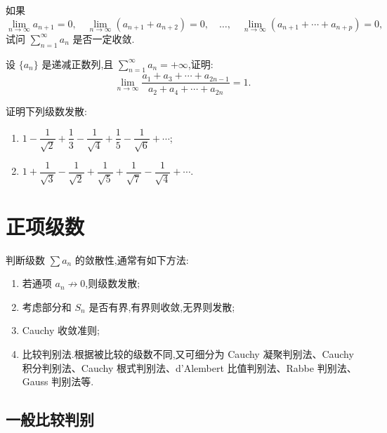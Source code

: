 \documentclass[../数学分析培优讲义.tex]{subfiles}
\begin{document}
\begin{example}
如果
\[
    \lim\limits_{n\to\infty}a_{n+1}=0,
    \quad
    \lim\limits_{n\to\infty}(a_{n+1}+a_{n+2})=0,
    \quad\ldots,\quad
    \lim\limits_{n\to\infty}(a_{n+1}+\cdots+a_{n+p})=0,
\]
试问 $\displaystyle\sum\limits_{n=1}^{\infty}a_n$ 是否一定收敛.
\end{example}
\exampleblank

\begin{example}
设 $\{a_n\}$ 是递减正数列,且 $\displaystyle\sum\limits_{n=1}^{\infty}a_n=+\infty$,证明:
\[
    \lim\limits_{n\to\infty}
    \dfrac{a_1+a_3+\cdots+a_{2n-1}}{a_2+a_4+\cdots+a_{2n}}=1.
\]
\end{example}
\exampleblank

\begin{example}
证明下列级数发散:
\begin{enumerate}[label=(\arabic*)]
    \item $\displaystyle1-\dfrac{1}{\sqrt2}+\dfrac{1}{3}-\dfrac{1}{\sqrt4}+\dfrac{1}{5}-\dfrac{1}{\sqrt6}+\cdots$;
    \item $\displaystyle1+\dfrac{1}{\sqrt3}-\dfrac{1}{\sqrt2}+\dfrac{1}{\sqrt5}+\dfrac{1}{\sqrt7}-\dfrac{1}{\sqrt4}+\cdots$.
\end{enumerate}
\end{example}
\exampleblank


\newpage

\section{正项级数}

判断级数 $\displaystyle\sum a_n$ 的敛散性,通常有如下方法:
\begin{enumerate}[label=\textcircled{\arabic*}]
    \item 若通项 $a_n\not\to0$,则级数发散;
    \item 考虑部分和 $S_n$ 是否有界,有界则收敛,无界则发散;
    \item Cauchy 收敛准则;
    \item 比较判别法.根据被比较的级数不同,又可细分为 Cauchy 凝聚判别法、Cauchy 积分判别法、Cauchy 根式判别法、d'Alembert 比值判别法、Rabbe 判别法、Gauss 判别法等.
\end{enumerate}


\newpage

\subsection{一般比较判别}
\end{document}
